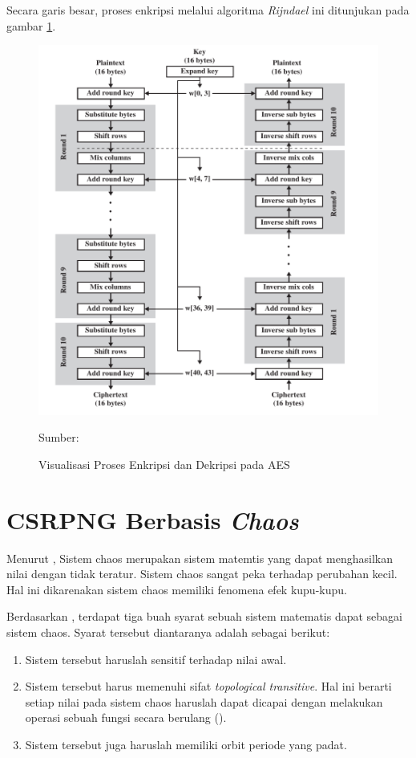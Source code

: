 Secara garis besar, proses enkripsi melalui algoritma \emph{Rijndael} ini ditunjukan pada gambar \ref{fig:crypto.aes}.


\begin{figure}[!h]
  \centering
  \includegraphics[width=\textwidth]{chapters/res/chapter-2/img/crypto.aes.png}
  \caption{Visualisasi Proses Enkripsi dan Dekripsi pada AES} \label{fig:crypto.aes}
  Sumber: \textcite{staling2011}\text

\end{figure}

\section{CSRPNG Berbasis \emph{Chaos}}
Menurut \textcite{munir2019}, Sistem chaos merupakan sistem matemtis yang dapat menghasilkan nilai dengan tidak teratur. Sistem chaos sangat peka terhadap perubahan kecil. Hal ini dikarenakan sistem chaos memiliki fenomena efek kupu-kupu.

Berdasarkan \textcite{boris2003}, terdapat tiga buah syarat sebuah sistem matematis dapat sebagai sistem chaos. Syarat tersebut diantaranya adalah sebagai berikut:
\begin{enumerate}
  \item Sistem tersebut haruslah sensitif terhadap nilai awal.
  \item Sistem tersebut harus memenuhi sifat \emph{topological transitive}. Hal ini berarti setiap nilai pada sistem chaos haruslah dapat dicapai dengan melakukan operasi sebuah fungsi secara berulang (\textcite{boris2003}).
  \item Sistem tersebut juga haruslah memiliki orbit periode yang padat.
\end{enumerate}

